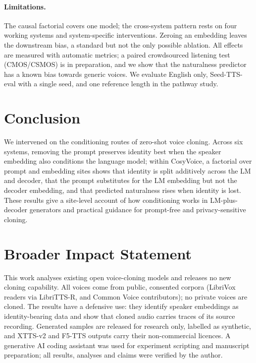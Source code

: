\documentclass[10pt]{article}
\begin{document}
\paragraph{Limitations.}
The causal factorial covers one model; the cross-system pattern rests on four working systems and system-specific interventions.
Zeroing an embedding leaves the downstream bias, a standard but not the only possible ablation.
All effects are measured with automatic metrics; a paired crowdsourced listening test (CMOS/CSMOS) is in preparation, and we show that the naturalness predictor has a known bias towards generic voices.
We evaluate English only, Seed-TTS-eval with a single seed, and one reference length in the pathway study.

\section{Conclusion}

We intervened on the conditioning routes of zero-shot voice cloning.
Across six systems, removing the prompt preserves identity best when the speaker embedding also conditions the language model; within CosyVoice, a factorial over prompt and embedding sites shows that identity is split additively across the LM and decoder, that the prompt substitutes for the LM embedding but not the decoder embedding, and that predicted naturalness rises when identity is lost.
These results give a site-level account of how conditioning works in LM-plus-decoder generators and practical guidance for prompt-free and privacy-sensitive cloning.

\section*{Broader Impact Statement}
This work analyses existing open voice-cloning models and releases no new cloning capability.
All voices come from public, consented corpora (LibriVox readers via LibriTTS-R, and Common Voice contributors); no private voices are cloned.
The results have a defensive use: they identify speaker embeddings as identity-bearing data and show that cloned audio carries traces of its source recording.
Generated samples are released for research only, labelled as synthetic, and XTTS-v2 and F5-TTS outputs carry their non-commercial licences.
A generative AI coding assistant was used for experiment scripting and manuscript preparation; all results, analyses and claims were verified by the author.
\end{document}
